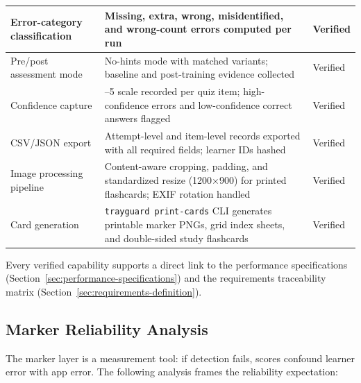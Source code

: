 \documentclass[10pt,a4paper]{article}
\begin{document}
\begin{table}[H]
\begin{tabularx}{\textwidth}{|>{\raggedright\arraybackslash}X|>{\raggedright\arraybackslash}X|>{\raggedright\arraybackslash}X|}
\hline
Error-category classification & Missing, extra, wrong, misidentified, and wrong-count errors computed per run & Verified \\
\hline
Pre/post assessment mode & No-hints mode with matched variants; baseline and post-training evidence collected & Verified \\
\hline
Confidence capture & 1--5 scale recorded per quiz item; high-confidence errors and low-confidence correct answers flagged & Verified \\
\hline
CSV/JSON export & Attempt-level and item-level records exported with all required fields; learner IDs hashed & Verified \\
\hline
Image processing pipeline & Content-aware cropping, padding, and standardized resize (1200$\times$900) for printed flashcards; EXIF rotation handled & Verified \\
\hline
Card generation & \texttt{trayguard print-cards} CLI generates printable marker PNGs, grid index sheets, and double-sided study flashcards & Verified \\
\hline
\end{tabularx}
\end{table}

Every verified capability supports a direct link to the performance
specifications (Section~\ref{sec:performance-specifications}) and the
requirements traceability matrix
(Section~\ref{sec:requirements-definition}).

\subsection{Marker Reliability Analysis}
\label{sec:marker-reliability-analysis}

The marker layer is a measurement tool: if detection fails, scores confound
learner error with app error. The following analysis frames the reliability
expectation:
\end{document}
